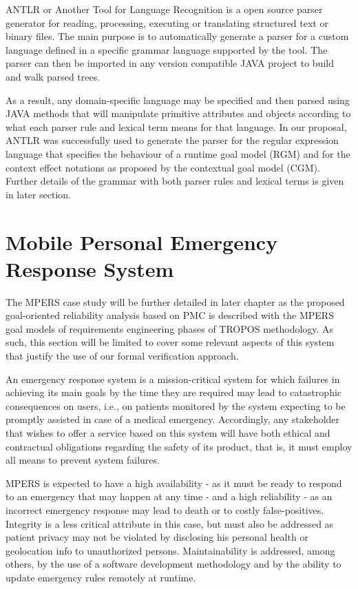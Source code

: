 ANTLR or Another Tool for Language Recognition is a open source parser generator for reading, processing, executing or translating structured text or binary files. The main purpose is to automatically generate a parser for a custom language defined in a specific grammar language supported by the tool. The parser can then be imported in any version compatible JAVA project to build and walk parsed trees. 

As a result, any domain-specific language may be specified and then parsed using JAVA methods that will manipulate primitive attributes and objects according to what each parser rule and lexical term means for that language. In our proposal, ANTLR was successfully used to generate the parser for the regular expression language that specifies the behaviour of a runtime goal model (RGM) and for the context effect notations as proposed by the contextual goal model (CGM). Further details of the grammar with both parser rules and lexical terms is given in later section.

\section{Mobile Personal Emergency Response System}

The MPERS case study will be further detailed in later chapter as the proposed goal-oriented reliability analysis based on PMC is described with the MPERS goal models of requirements engineering phases of TROPOS methodology. As such, this section will be limited to cover some relevant aspects of this system that justify the use of our formal verification approach.

An emergency response system is a mission-critical system for which failures in achieving its main goals by the time they are required may lead to catastrophic consequences on users, i.e., on patients monitored by the system expecting to be promptly assisted in case of a medical emergency. Accordingly, any stakeholder that wishes to offer a service based on this system will have both ethical and contractual obligations regarding the safety of its product, that is, it must employ all means to prevent system failures.

MPERS is expected to have a high availability - as it must be ready to respond to an emergency that may happen at any time - and a high reliability - as an incorrect emergency response may lead to death or to costly false-positives. Integrity is a less critical attribute in this case, but must also be addressed as patient privacy may not be violated by disclosing his personal health or geolocation info to unauthorized persons. Maintainability is addressed, among others, by the use of a software development methodology and by the ability to update emergency rules remotely at runtime.

